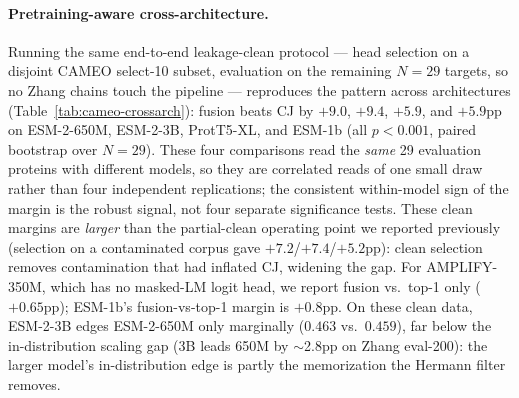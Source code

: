 \documentclass{article}
\begin{document}
\paragraph{Pretraining-aware cross-architecture.}
Running the same end-to-end leakage-clean protocol --- head selection on a
disjoint CAMEO select-10 subset, evaluation on the remaining $N{=}29$
targets, so no Zhang chains touch the pipeline --- reproduces the pattern
across architectures (Table~\ref{tab:cameo-crossarch}): fusion beats CJ by
$+9.0$, $+9.4$, $+5.9$, and $+5.9$pp on ESM-2-650M, ESM-2-3B, ProtT5-XL,
and ESM-1b (all $p{<}0.001$, paired bootstrap over $N{=}29$). These four
comparisons read the \emph{same} 29 evaluation proteins with different
models, so they are correlated reads of one small draw rather than four
independent replications; the consistent within-model sign of the margin
is the robust signal, not four separate significance tests. These clean
margins are \emph{larger} than the partial-clean operating point we
reported previously (selection on a contaminated corpus gave
$+7.2$/$+7.4$/$+5.2$pp): clean selection removes contamination that had
inflated CJ, widening the gap. For AMPLIFY-350M, which has no masked-LM
logit head, we report fusion vs.\ top-1 only ($+0.65$pp); ESM-1b's
fusion-vs-top-1 margin is \mbox{$+0.8$pp}. On these clean data, ESM-2-3B
edges ESM-2-650M only marginally ($0.463$ vs.\ $0.459$), far below the
in-distribution scaling gap (3B leads 650M by $\sim$2.8pp on Zhang
eval-200): the larger model's in-distribution edge is partly the
memorization the Hermann filter removes.
\end{document}
